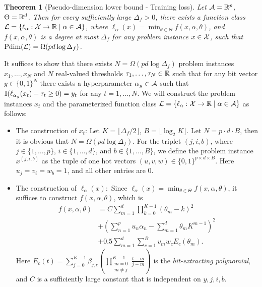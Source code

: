 \documentclass{article}
\theoremstyle{plain}
\newtheorem{theorem}{Theorem}[section]
\theoremstyle{definition}
\theoremstyle{remark}
\begin{document}
    \begin{theorem}[Pseudo-dimension lower bound - Training loss] \label{thm:pdim-tuning-training-lower-bound}
        Let $\mathcal{A} = \mathbb{R}^p$, $\Theta = \mathbb{R}^d$. Then for every sufficiently large $\Delta_f > 0$, there exists a function class $\mathcal{L} = \{\ell_\alpha: \mathcal{X} \rightarrow \mathbb{R} \mid \alpha \in \mathcal{A}\}$, where $\ell_\alpha(x) = \min_{\theta \in \Theta} f(x, \alpha, \theta)$, and $f(x, \alpha, \theta)$ is a degree at most $\Delta_f$ for any problem instance $x \in \mathcal{X}$, such that $\text{\normalfont Pdim}(\mathcal{L}) = \Omega(pd\log \Delta_f)$.
    \end{theorem}

    \proof 
        It suffices to show that there exists $N = \Omega(pd\log \Delta_f)$ problem instances $x_1, \dots, x_N$ and $N$ real-valued thresholds $\tau_1, \dots, \tau_N \in \mathbb{R}$ such that for any bit vector $y \in \{0, 1\}^N$ there exists a hyperparameter $\alpha_y \in \mathcal{A}$ such that $\mathbb{I}(\ell_{\alpha_y}(x_t) - \tau_t \geq 0) = y_t$ for any $t = 1, \dots, N$. We will construct the problem instances $x_t$ and the parameterized function class $\mathcal{L} = \{\ell_{\alpha}: \mathcal{X} \rightarrow \mathbb{R} \mid \alpha \in \mathcal{A}\}$ as follows:
        \begin{itemize}[leftmargin=*]
            \item The construction of $x_t$: Let $K = \lfloor \Delta_f / 2 \rfloor$, $B = \lfloor \log_2 K\rfloor$. Let $N = p \cdot d \cdot B$, then it is obvious that $N = \Omega(pd \log \Delta_f)$. For the triplet $(j, i, b)$, where $j \in \{1, \dots, p\}$, $i \in \{1, \dots, d\}$, and $b \in \{1, \dots, B\}$, we define the problem instance $x^{(j, i, b)}$ as the tuple of one hot vectors $(u, v, w) \in \{0, 1\}^{p \times d \times B}$. Here $u_j = v_i = w_b = 1$, and all other entries are 0.  

            \item The construction of $\ell_\alpha(x):$ Since $\ell_\alpha(x) = \min_{\theta \in \Theta} f(x, \alpha, \theta)$, it suffices to construct $f(x, \alpha, \theta)$, which is
            \begin{equation*}
                \begin{aligned}
                     f(x, \alpha, \theta)  &= C \sum_{m=1}^d \prod_{k=0}^{K-1} (\theta_m - k)^2 \\
                     &+ \left( \sum_{n=1}^p u_n \alpha_n - \sum_{m=1}^d \theta_m K^{m-1} \right)^2 \\
                     &+ 0.5 \sum_{m=1}^d \sum_{c=1}^B v_m w_c E_c(\theta_m).
                \end{aligned}
            \end{equation*}
            Here $E_c(t) =\sum_{j=0}^{K-1} \beta_{j, c} \left( \prod_{\substack{m=0 \\ m \neq j}}^{K-1} \frac{t - m}{j - m} \right)$ is the \textit{bit-extracting polynomial}, and $C$ is a sufficiently large constant that is independent on $y, j, i, b$.
        \end{itemize}
\end{document}
